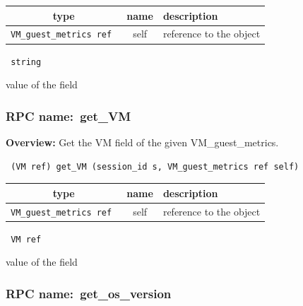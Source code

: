 
 
\vspace{0.3cm}
\begin{tabular}{|c|c|p{7cm}|}
 \hline
{\bf type} & {\bf name} & {\bf description} \\ \hline
{\tt VM\_guest\_metrics ref } & self & reference to the object \\ \hline 

\end{tabular}

\vspace{0.3cm}

{\tt 
string
}


value of the field
\vspace{0.3cm}
\vspace{0.3cm}
\vspace{0.3cm}
\subsubsection{RPC name:~get\_VM}

{\bf Overview:} 
Get the VM field of the given VM\_guest\_metrics.

\begin{verbatim} (VM ref) get_VM (session_id s, VM_guest_metrics ref self)\end{verbatim}



 
\vspace{0.3cm}
\begin{tabular}{|c|c|p{7cm}|}
 \hline
{\bf type} & {\bf name} & {\bf description} \\ \hline
{\tt VM\_guest\_metrics ref } & self & reference to the object \\ \hline 

\end{tabular}

\vspace{0.3cm}

{\tt 
VM ref
}


value of the field
\vspace{0.3cm}
\vspace{0.3cm}
\vspace{0.3cm}
\subsubsection{RPC name:~get\_os\_version}

